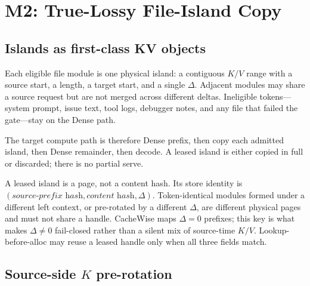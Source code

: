 \section{M2: True-Lossy File-Island Copy}
\label{sec:kv-management}

\subsection{Islands as first-class KV objects}

Each eligible file module is one physical island: a contiguous $K/V$
range with a source start, a length, a target start, and a single
$\Delta$. Adjacent modules may share a source request but are not merged
across different deltas. Ineligible tokens---system prompt, issue text,
tool logs, debugger notes, and any file that failed the gate---stay on the
Dense path.

The target compute path is therefore Dense prefix, then copy each
admitted island, then Dense remainder, then decode. A leased island is
either copied in full or discarded; there is no partial serve.

A leased island is a page, not a content hash. Its store identity is
$(\textit{source-prefix hash}, \textit{content hash}, \Delta)$.
Token-identical modules formed under a different left context, or
pre-rotated by a different $\Delta$, are different physical pages and
must not share a handle. CacheWise maps $\Delta{=}0$ prefixes; this key
is what makes $\Delta\neq 0$ fail-closed rather than a silent mix of
source-time $K/V$. Lookup-before-alloc may reuse a leased handle only
when all three fields match.

\subsection{\texorpdfstring{Source-side $K$ pre-rotation}{Source-side K pre-rotation}}

